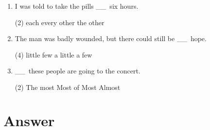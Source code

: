 \documentclass{yufa}
\newcommand\ttu{ \_\_\ }
\begin{document}
\begin{enumerate}
\item I was told to take the pills  \ttu six hours.
  \begin{tasks}(2)
    \task each \task every \task other \task the other
  \end{tasks}


\item The man was badly wounded, but there could still be  \ttu  hope.
  \begin{tasks}(4)
    \task little \task few \task a little \task a few
  \end{tasks}

\item  \ttu  these people are going to the concert.
  \begin{tasks}(2)
    \task The most \task Most of \task Most \task Almost
  \end{tasks}

\end{enumerate}

\section{Answer}
\end{document}
